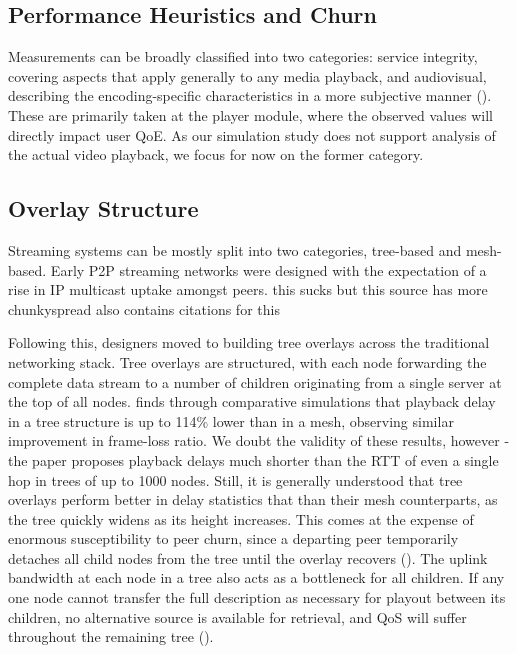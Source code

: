 \documentclass[12pt,a4paper]{article}
\begin{document}
\subsection{Performance Heuristics and Churn} \label{litreview:heuristics}
Measurements can be broadly classified into two categories: service integrity, covering aspects that apply generally to any media playback, and audiovisual, describing the encoding-specific characteristics in a more subjective manner (\cite{Moltchanov2011}). These are primarily taken at the player module, where the observed values will directly impact user QoE. As our simulation study does not support analysis of the actual video playback, we focus for now on the former category.



\subsection{Overlay Structure} \label{litreview:structure}
Streaming systems can be mostly split into two categories, tree-based and mesh-based. Early P2P streaming networks were designed with the expectation of a rise in IP multicast uptake amongst peers. this sucks but this source \cite{Ghoshal2007} has more chunkyspread also contains citations for this

Following this, designers moved to building tree overlays across the traditional networking stack. Tree overlays are structured, with each node forwarding the complete data stream to a number of children originating from a single server at the top of all nodes. \cite{Goh2013} finds through comparative simulations that playback delay in a tree structure is up to 114\% lower than in a mesh, observing similar improvement in frame-loss ratio. We doubt the validity of these results, however - the paper proposes playback delays much shorter than the RTT of even a single hop in trees of up to 1000 nodes. Still, it is generally understood that tree overlays perform better in delay statistics that than their mesh counterparts, as the tree quickly widens as its height increases.  This comes at the expense of enormous susceptibility to peer churn, since a departing peer temporarily detaches all child nodes from the tree until the overlay recovers (\cite{Ghoshal2007}). The uplink bandwidth at each node in a tree also acts as a bottleneck for all children. If any one node cannot transfer the full description as necessary for playout between its children, no alternative source is available for retrieval, and QoS will suffer throughout the remaining tree (\cite{Magharei2007}).
\end{document}
